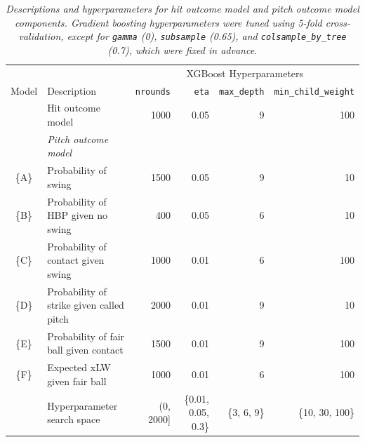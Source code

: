 \documentclass[
  12pt]{article}
\begin{document}
        \begin{table}
          \hspace{-6mm}
          \begin{tabular}{cl|rrrr}
                  &                                             & \multicolumn{4}{c}{XGBoost Hyperparameters}\\
            Model & Description                                 & \texttt{nrounds}  & \texttt{eta}        & \texttt{max\_depth} & \texttt{min\_child\_weight}\\
            \hline        
                  & Hit outcome model                           & 1000              & 0.05                & 9                   & 100\\
            \hline        
                  & {\it Pitch outcome model}\\
            \{A\} & Probability of swing                        & 1500              & 0.05                & 9                   & 10\\
            \{B\} & Probability of HBP given no swing  &  400              & 0.05                & 6                   & 10\\
            \{C\} & Probability of contact given swing          & 1000              & 0.01                & 6                   & 100\\
            \{D\} & Probability of strike given called pitch    & 2000              & 0.01                & 9                   & 10\\
            \{E\} & Probability of fair ball given contact      & 1500              & 0.01                & 9                   & 100\\
            \{F\} & Expected xLW given fair ball                & 1000              & 0.01                & 6                   & 100\\
            \hline
                & Hyperparameter search space                   & (0, 2000]         & \{0.01, 0.05, 0.3\} & \{3, 6, 9\}         & \{10, 30, 100\}
          \end{tabular}
          \caption{\it Descriptions and hyperparameters for hit outcome model and pitch outcome model components. Gradient boosting hyperparameters were tuned using 5-fold cross-validation, except for \texttt{gamma} (0), \texttt{subsample} (0.65), and \texttt{colsample\_by\_tree} (0.7), which were fixed in advance.}
          \label{tab:xgboost-hyperparameters}
        \end{table}
        
\end{document}
